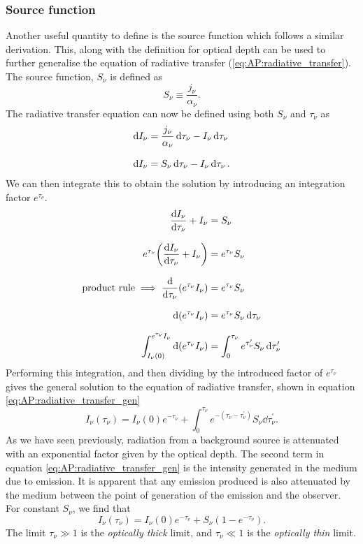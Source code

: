 \subsubsection{Source function}
Another useful quantity to define is the source function which follows a similar derivation. %
This, along with the definition for optical depth can be used to further generalise the equation of radiative transfer (\ref{eq:AP:radiative_transfer}).
 The source function, \(S_\nu\) is defined as
%
\begin{equation}
	S_\nu \equiv \frac{j_\nu}{\alpha_\nu}.
\end{equation}
%
The radiative transfer equation can now be defined using both \(S_\nu\) and \(\tau_\nu\) as
%
\begin{align*}
	\dd{I_\nu} &= \frac{j_\nu}{\alpha_\nu} \dd{\tau_\nu} - I_\nu \dd{\tau_\nu}
	\linedrop
	\dd{I_\nu} &= S_\nu \dd{\tau_\nu} - I_\nu \dd{\tau_\nu}.
\end{align*}
%
We can then integrate this to obtain the solution by introducing an integration factor \(e^{\tau_\nu}\).
%
\begin{align*}
	\dv{I_\nu}{\tau_\nu} + I_\nu &= S_\nu
	\linedrop
	e^{\tau_\nu} \qty( \dv{I_\nu}{\tau_\nu} + I_\nu ) &= e^{\tau_\nu} S_\nu
	\linedrop
	\text{product rule} \implies 
	\dv{\tau_\nu}( e^{\tau_\nu} I_\nu ) &= e^{\tau_\nu} S_\nu
	\linedrop
	\dd{(e^{\tau_\nu} I_\nu)} &= e^{\tau_\nu} S_\nu \dd{\tau_\nu}
	\linedrop
	\int_{I_\nu (0)}^{e^{\tau_\nu} I_\nu} \dd{(e^{\tau_\nu} I_\nu)} &= \int_{0}^{\tau_\nu} e^{\tau^{\prime}_\nu} S_\nu \dd{\tau^\prime_\nu}
\end{align*}
%
Performing this integration, and then dividing by the introduced factor of \(e^{\tau_\nu}\) gives the general solution to the equation of radiative transfer, shown in equation \ref{eq:AP:radiative_transfer_gen}
%
\begin{equation}
	I_\nu (\tau_\nu) = I_\nu (0) e^{-\tau_\nu} + \int_{0}^{\tau_\nu} e^{-(\tau_\nu - \tau^\prime_\nu)} S_\nu \dd{\tau^\prime_\nu}.
	\label{eq:AP:radiative_transfer_gen}
\end{equation}
%
As we have seen previously, radiation from a background source is attenuated with an exponential factor given by the optical depth.
 The second term in equation \ref{eq:AP:radiative_transfer_gen} is the intensity generated in the medium due to emission.
 It is apparent that any emission produced is also attenuated by the medium between the point of generation of the emission and the observer.
 For constant \(S_\nu\), we find that
%
\begin{equation}
	I_\nu (\tau_\nu) = I_\nu (0) e^{-\tau_\nu} + S_\nu (1 - e^{-\tau_\nu}).
\end{equation}
%
The limit \(\tau_\nu \gg 1\) is the \emph{optically thick} limit, and \(\tau_\nu \ll 1\) is the \emph{optically thin} limit.
%
%
%
